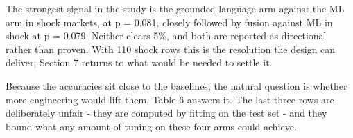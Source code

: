 \begin{table}[H]
\centering
\scriptsize
\setlength{\tabcolsep}{4pt}
\caption{Exact paired McNemar tests. Only rows on which two systems disagree carry information, which is why this is the right test for paired predictions.}
\label{tab:mcnemar-tests}
\end{table}

The strongest signal in the study is the grounded language arm against
the ML arm in shock markets, at p = 0.081, closely followed by fusion
against ML in shock at p = 0.079. Neither clears 5\%, and both are
reported as directional rather than proven. With 110 shock rows this is
the resolution the design can deliver; Section 7 returns to what would
be needed to settle it.

Because the accuracies sit close to the baselines, the natural question
is whether more engineering would lift them. Table 6 answers it. The
last three rows are deliberately unfair - they are computed by fitting
on the test set - and they bound what any amount of tuning on these four
arms could achieve.

